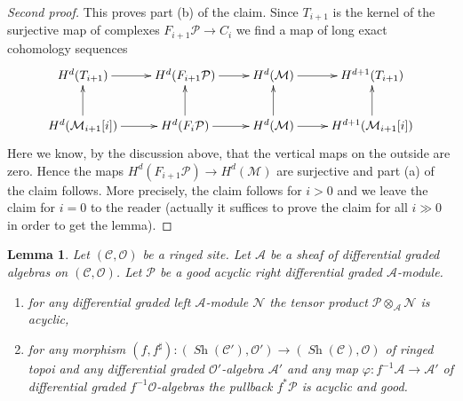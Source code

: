 \documentclass{stacks-project}
\theoremstyle{plain}
\newtheorem{lemma}[subsection]{Lemma}
\theoremstyle{definition}
\theoremstyle{remark}
\numberwithin{equation}{subsection}
\def\Sh{\mathop{\mathit{Sh}}\nolimits}
\begin{document}
\begin{proof}[Second proof]
This proves part (b) of the claim.
Since $T_{i + 1}$ is the kernel of the surjective map of complexes
$F_{i + 1}\mathcal{P} \to C_i$ we find a map of long exact
cohomology sequences
$$
\xymatrix{
H^d(T_{i + 1}) \ar[r] &
H^d(F_{i + 1}\mathcal{P}) \ar[r] &
H^d(\mathcal{M}) \ar[r] &
H^{d + 1}(T_{i + 1}) \\
H^d(\mathcal{M}_{i + 1}[i]) \ar[r] \ar[u] &
H^d(F_i\mathcal{P}) \ar[r] \ar[u] &
H^d(\mathcal{M}) \ar[r] \ar[u] &
H^{d + 1}(\mathcal{M}_{i + 1}[i]) \ar[u]
}
$$
Here we know, by the discussion above, that the vertical maps
on the outside are zero. Hence the maps
$H^d(F_{i + 1}\mathcal{P}) \to H^d(\mathcal{M})$
are surjective and part (a) of the claim follows.
More precisely, the claim follows for $i > 0$ and we leave the
claim for $i = 0$ to the reader (actually it suffices to prove
the claim for all $i \gg 0$ in order to get the lemma).
\end{proof}

\begin{lemma}
\label{lemma-acyclic-good}
Let $(\mathcal{C}, \mathcal{O})$ be a ringed site.
Let $\mathcal{A}$ be a sheaf of differential graded algebras
on $(\mathcal{C}, \mathcal{O})$. Let $\mathcal{P}$ be a good
acyclic right differential graded $\mathcal{A}$-module.
\begin{enumerate}
\item for any differential graded left $\mathcal{A}$-module
$\mathcal{N}$ the tensor product
$\mathcal{P} \otimes_\mathcal{A} \mathcal{N}$ is acyclic,
\item for any morphism $(f, f^\sharp) : (\Sh(\mathcal{C}'), \mathcal{O}')
\to (\Sh(\mathcal{C}), \mathcal{O})$
of ringed topoi and any differential graded $\mathcal{O}'$-algebra
$\mathcal{A}'$ and any map $\varphi : f^{-1}\mathcal{A} \to \mathcal{A}'$
of differential graded $f^{-1}\mathcal{O}$-algebras
the pullback $f^*\mathcal{P}$ is acyclic and good.
\end{enumerate}
\end{lemma}
\end{document}
